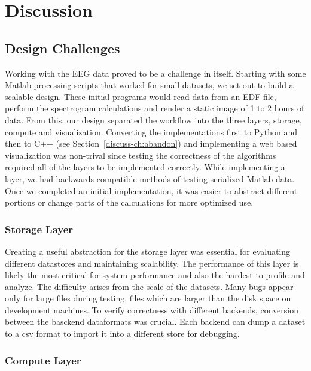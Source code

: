 \chapter{Discussion}\label{discuss-ch}

\section{Design Challenges}

Working with the EEG data proved to be a challenge in itself. Starting with
some Matlab processing scripts that worked for small datasets, we set out to
build a scalable design. These initial programs would read data from an EDF
file, perform the spectrogram calculations and render a static image of 1 to 2
hours of data. From this, our design separated the workflow into the three
layers, storage, compute and visualization. Converting the implementations
first to Python and then to C++ (see Section~\ref{discuss-ch:abandon}) and
implementing a web based visualization was non-trival since testing the
correctness of the algorithms required all of the layers to be implemented
correctly. While implementing a layer, we had backwards compatible methods of
testing serialized Matlab data. Once we completed an initial implementation, it
was easier to abstract different portions or change parts of the calculations
for more optimized use. \\

\subsection{Storage Layer}

Creating a useful abstraction for the storage layer was essential for
evaluating different datastores and maintaining scalability. The performance of
this layer is likely the most critical for system performance and also the
hardest to profile and analyze. The difficulty arises from the scale of the
datasets. Many bugs appear only for large files during testing, files which are
larger than the disk space on development machines. To verify correctness with
different backends, conversion between the basckend dataformats was crucial.
Each backend can dump a dataset to a csv format to import it into a different
store for debugging.

\subsection{Compute Layer}


